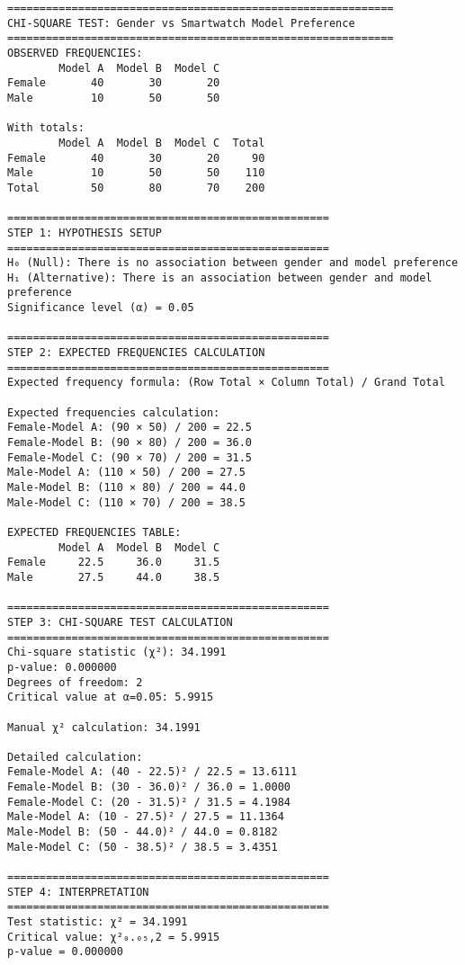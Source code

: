 \documentclass[11pt]{article}
\begin{document}
    \begin{Verbatim}[commandchars=\\\{\}]
============================================================
CHI-SQUARE TEST: Gender vs Smartwatch Model Preference
============================================================
OBSERVED FREQUENCIES:
        Model A  Model B  Model C
Female       40       30       20
Male         10       50       50

With totals:
        Model A  Model B  Model C  Total
Female       40       30       20     90
Male         10       50       50    110
Total        50       80       70    200

==================================================
STEP 1: HYPOTHESIS SETUP
==================================================
H₀ (Null): There is no association between gender and model preference
H₁ (Alternative): There is an association between gender and model preference
Significance level (α) = 0.05

==================================================
STEP 2: EXPECTED FREQUENCIES CALCULATION
==================================================
Expected frequency formula: (Row Total × Column Total) / Grand Total

Expected frequencies calculation:
Female-Model A: (90 × 50) / 200 = 22.5
Female-Model B: (90 × 80) / 200 = 36.0
Female-Model C: (90 × 70) / 200 = 31.5
Male-Model A: (110 × 50) / 200 = 27.5
Male-Model B: (110 × 80) / 200 = 44.0
Male-Model C: (110 × 70) / 200 = 38.5

EXPECTED FREQUENCIES TABLE:
        Model A  Model B  Model C
Female     22.5     36.0     31.5
Male       27.5     44.0     38.5

==================================================
STEP 3: CHI-SQUARE TEST CALCULATION
==================================================
Chi-square statistic (χ²): 34.1991
p-value: 0.000000
Degrees of freedom: 2
Critical value at α=0.05: 5.9915

Manual χ² calculation: 34.1991

Detailed calculation:
Female-Model A: (40 - 22.5)² / 22.5 = 13.6111
Female-Model B: (30 - 36.0)² / 36.0 = 1.0000
Female-Model C: (20 - 31.5)² / 31.5 = 4.1984
Male-Model A: (10 - 27.5)² / 27.5 = 11.1364
Male-Model B: (50 - 44.0)² / 44.0 = 0.8182
Male-Model C: (50 - 38.5)² / 38.5 = 3.4351

==================================================
STEP 4: INTERPRETATION
==================================================
Test statistic: χ² = 34.1991
Critical value: χ²₀.₀₅,2 = 5.9915
p-value = 0.000000


\end{Verbatim}
\end{document}
